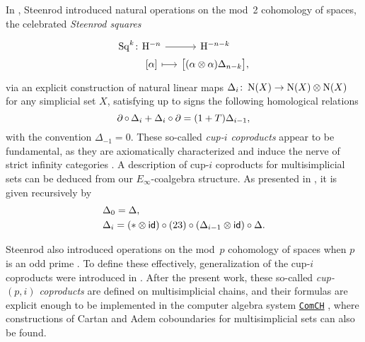 In \cite{steenrod1947products}, Steenrod introduced natural operations on the mod~2 cohomology of spaces, the celebrated \textit{Steenrod squares}
\[
\begin{tikzcd} [column sep=small, row sep=0]
	\Sq^k \colon &[-20] \rH^{-n} \arrow[r] & \rH^{-n-k} \\ &
	{[\alpha]} \arrow[r, mapsto] & \big[ (\alpha \ot \alpha) \Delta_{n-k} \big],
\end{tikzcd}
\]
via an explicit construction of natural linear maps $\Delta_i \colon \operatorname{N}(X) \to \operatorname{N}(X) \otimes \operatorname{N}(X)$ for any simplicial set $X$, satisfying up to signs the following homological relations
\[
\operatorname{\partial} \circ \, \Delta_i + \Delta_i \circ \operatorname{\partial} = (1 + T) \Delta_{i-1},
\]
with the convention $\Delta_{-1} = 0$.
These so-called \textit{cup-$i$ coproducts} appear to be fundamental, as they are axiomatically characterized \cite{medina2022axiomatic} and induce the nerve of strict infinity categories \cite{medina2020globular}.
A description of cup-$i$ coproducts for multisimplicial sets can be deduced from our $E_\infty$-coalgebra structure.
As presented in \cite{medina2023dennis}, it is given recursively by
\[
\begin{split}
	& \Delta_0 = \Delta, \\
	& \Delta_i =
	(\ast \otimes \mathsf{id}) \circ (23) \circ (\Delta_{i-1} \otimes \mathsf{id}) \circ \Delta.
\end{split}
\]

Steenrod also introduced operations on the mod~$p$ cohomology of spaces when $p$ is an odd prime \cite{steenrod1952reduced, steenrod1953cyclic}.
To define these effectively, generalization of the cup-$i$ coproducts were introduced in \cite{medina2021may_st}.
After the present work, these so-called \textit{cup-$(p,i)$ coproducts} are defined on multisimplicial chains, and their formulas are explicit enough to be implemented in the computer algebra system \href{https://comch.readthedocs.io/en/latest/}{\texttt{ComCH}} \cite{medina2021comch}, where constructions of Cartan and Adem coboundaries \cite{medina2020cartan,medina2021adem,medina2023oddcartan} for multisimplicial sets can also be found.